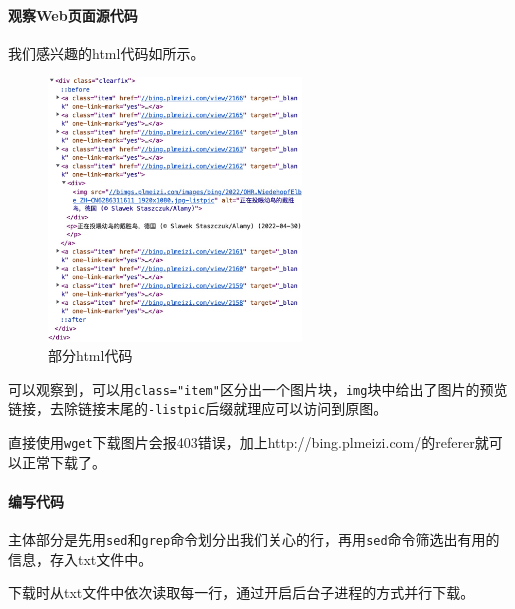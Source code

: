 \documentclass[lang=cn,11pt,a4paper,cite=authornum]{paper}
\begin{document}
\paragraph{观察Web页面源代码}

我们感兴趣的html代码如所示。 

\begin{figure}[htbp]
    \centering
    \includegraphics[width=0.6\textwidth]{./images/l3-p4.jpg}
    \caption{部分html代码\label{fig:p4}}
\end{figure}

可以观察到，可以用\texttt{class="item"}区分出一个图片块，\texttt{img}块中给出了图片的预览链接，去除链接末尾的\texttt{-listpic}后缀就理应可以访问到原图。

直接使用\texttt{wget}下载图片会报403错误，加上http://bing.plmeizi.com/的referer就可以正常下载了。

\paragraph{编写代码}

主体部分是先用\texttt{sed}和\texttt{grep}命令划分出我们关心的行，再用\texttt{sed}命令筛选出有用的信息，存入txt文件中。

下载时从txt文件中依次读取每一行，通过开启后台子进程的方式并行下载。
\end{document}
